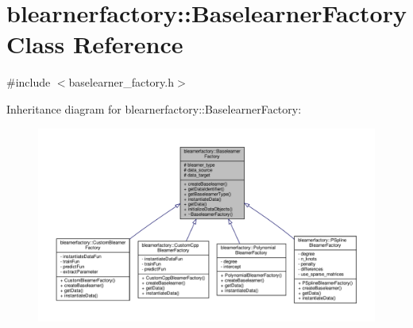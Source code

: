 \hypertarget{classblearnerfactory_1_1_baselearner_factory}{}\section{blearnerfactory\+:\+:Baselearner\+Factory Class Reference}
\label{classblearnerfactory_1_1_baselearner_factory}


{\ttfamily \#include $<$baselearner\+\_\+factory.\+h$>$}



Inheritance diagram for blearnerfactory\+:\+:Baselearner\+Factory\+:
\nopagebreak
\begin{figure}[H]
\begin{center}
\leavevmode
\includegraphics[width=350pt]{classblearnerfactory_1_1_baselearner_factory__inherit__graph}
\end{center}
\end{figure}


